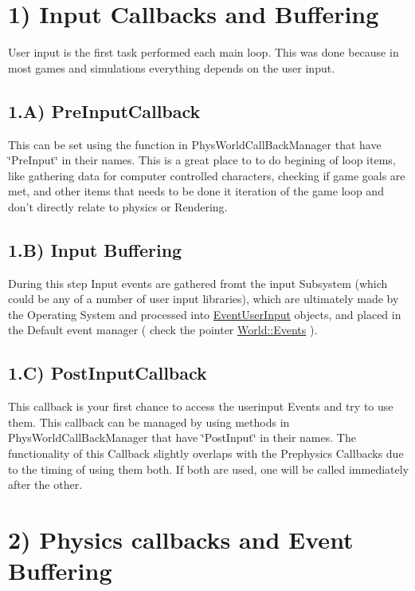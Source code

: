  \hypertarget{dd/d99/mainloop1_callbacks1}{}\section{1) Input Callbacks and Buffering}\label{dd/d99/mainloop1_callbacks1}
User input is the first task performed each main loop. This was done because in most games and simulations everything depends on the user input. \hypertarget{dd/d99/mainloop1_input1}{}\subsection{1.A) PreInputCallback}\label{dd/d99/mainloop1_input1}
This can be set using the function in PhysWorldCallBackManager that have \char`\"{}PreInput\char`\"{} in their names. This is a great place to to do begining of loop items, like gathering data for computer controlled characters, checking if game goals are met, and other items that needs to be done it iteration of the game loop and don't directly relate to physics or Rendering. \hypertarget{dd/d99/mainloop1_input2}{}\subsection{1.B) Input Buffering}\label{dd/d99/mainloop1_input2}
During this step Input events are gathered fromt the input Subsystem (which could be any of a number of user input libraries), which are ultimately made by the Operating System and processed into \hyperlink{classphys_1_1EventUserInput}{EventUserInput} objects, and placed in the Default event manager ( check the pointer \hyperlink{classphys_1_1World_ad0b13f1f3caf0342f56671b522543453}{World::Events} ). \hypertarget{dd/d99/mainloop1_input3}{}\subsection{1.C) PostInputCallback}\label{dd/d99/mainloop1_input3}
This callback is your first chance to access the userinput Events and try to use them. This callback can be managed by using methods in PhysWorldCallBackManager that have \char`\"{}PostInput\char`\"{} in their names. The functionality of this Callback slightly overlaps with the Prephysics Callbacks due to the timing of using them both. If both are used, one will be called immediately after the other. \par
 \hypertarget{dd/d99/mainloop1_callbacks2}{}\section{2) Physics callbacks and Event Buffering}\label{dd/d99/mainloop1_callbacks2}
